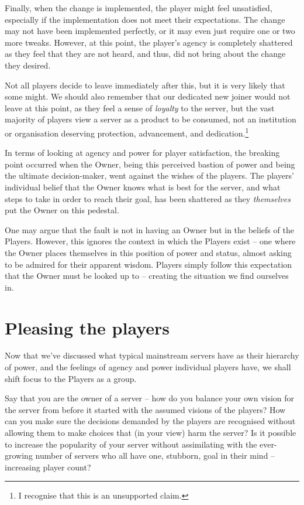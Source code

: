 Finally, when the change is implemented, the player might feel unsatisfied, especially if the implementation does not meet their expectations. The change may not have been implemented perfectly, or it may even just require one or two more tweaks. However, at this point, the player’s agency is completely shattered as they feel that they are not heard, and thus, did not bring about the change they desired.

Not all players decide to leave immediately after this, but it is very likely that some might. We should also remember that our dedicated new joiner would not leave at this point, as they feel a sense of \emph{loyalty} to the server, but the vast majority of players view a server as a product to be consumed, not an institution or organisation deserving protection, advancement, and dedication.\footnote{I recognise that this is an unsupported claim.}

In terms of looking at agency and power for player satisfaction, the breaking point occurred when the Owner, being this perceived bastion of power and being the ultimate decision-maker, went against the wishes of the players. The players’ individual belief that the Owner knows what is best for the server, and what steps to take in order to reach their goal, has been shattered as they \emph{themselves} put the Owner on this pedestal.

One may argue that the fault is not in having an Owner but in the beliefs of the Players. However, this ignores the context in which the Players exist – one where the Owner places themselves in this position of power and status, almost asking to be admired for their apparent wisdom. Players simply follow this expectation that the Owner must be looked up to – creating the situation we find ourselves in.

\section{Pleasing the players}
Now that we’ve discussed what typical mainstream servers have as their hierarchy of power, and the feelings of agency and power individual players have, we shall shift focus to the Players as a group.

Say that you are the owner of a server – how do you balance your own vision for the server from before it started with the assumed visions of the players? How can you make sure the decisions demanded by the players are recognised without allowing them to make choices that (in your view) harm the server? Is it possible to increase the popularity of your server without assimilating with the ever-growing number of servers who all have one, stubborn, goal in their mind – increasing player count?

